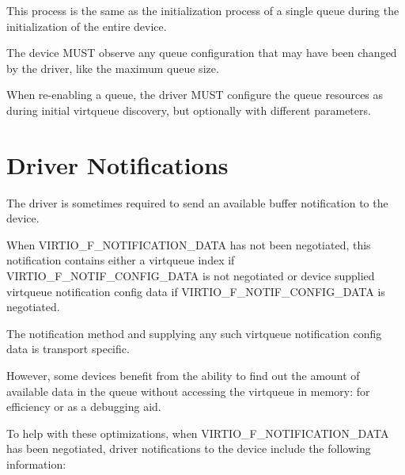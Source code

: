 This process is the same as the initialization process of a single queue during
the initialization of the entire device.


The device MUST observe any queue configuration that may have been
changed by the driver, like the maximum queue size.


When re-enabling a queue, the driver MUST configure the queue resources
as during initial virtqueue discovery, but optionally with different
parameters.





\section{Driver Notifications} \label{sec:Basic Facilities of a Virtio Device / Driver notifications}
The driver is sometimes required to send an available buffer
notification to the device.

When VIRTIO_F_NOTIFICATION_DATA has not been negotiated,
this notification contains either a virtqueue index if
VIRTIO_F_NOTIF_CONFIG_DATA is not negotiated or device supplied virtqueue
notification config data if VIRTIO_F_NOTIF_CONFIG_DATA is negotiated.

The notification method and supplying any such virtqueue notification config data
is transport specific.

However, some devices benefit from the ability to find out the
amount of available data in the queue without accessing the virtqueue in memory:
for efficiency or as a debugging aid.

To help with these optimizations, when VIRTIO_F_NOTIFICATION_DATA
has been negotiated, driver notifications to the device include
the following information:

